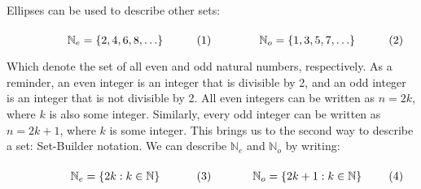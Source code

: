 \documentclass[crop=false,class=book,oneside]{standalone}
\begin{document}
            Ellipses can be used to describe other sets:
            \par\hfill\par
            \begin{subequations}
                \vspace{-1ex}
                \begin{minipage}{0.49\textwidth}
                    \begin{equation}
                        \mathbb{N}_{e}
                        =\{2,4,6,8,\hdots\}
                    \end{equation}
                \end{minipage}
                \hfill
                \begin{minipage}{0.49\textwidth}
                    \begin{equation}
                        \mathbb{N}_{o}
                        =\{1,3,5,7,\hdots\}
                    \end{equation}
                \end{minipage}
            \end{subequations}
            \par\hfill\par
            Which denote the set of all even and odd
            natural numbers, respectively. As a reminder,
            an even integer is an integer that is
            divisible by 2, and an odd integer is an
            integer that is not divisible by 2. All even
            integers can be written as $n=2k$, where $k$
            is also some integer. Similarly, every odd
            integer can be written as $n=2k+1$, where
            $k$ is some integer. This brings us to the
            second way to describe a set:
            Set-Builder notation. We can describe
            $\mathbb{N}_{e}$ and $\mathbb{N}_{o}$ by
            writing:
            \par\hfill\par
            \begin{subequations}
                \vspace{-1ex}
                \begin{minipage}{0.49\textwidth}
                    \begin{equation}
                        \label{EQN:Elem_Alg_Even_Nat_Def}
                        \mathbb{N}_{e}
                        =\{2k:k\in\mathbb{N}\}
                    \end{equation}
                \end{minipage}
                \hfill
                \begin{minipage}{0.49\textwidth}
                    \begin{equation}
                        \label{EQN:Elem_Alg_Odd_Nat_Def}
                        \mathbb{N}_{o}
                        =\{2k+1:k\in\mathbb{N}\}
                    \end{equation}
                \end{minipage}
            \end{subequations}
\end{document}
